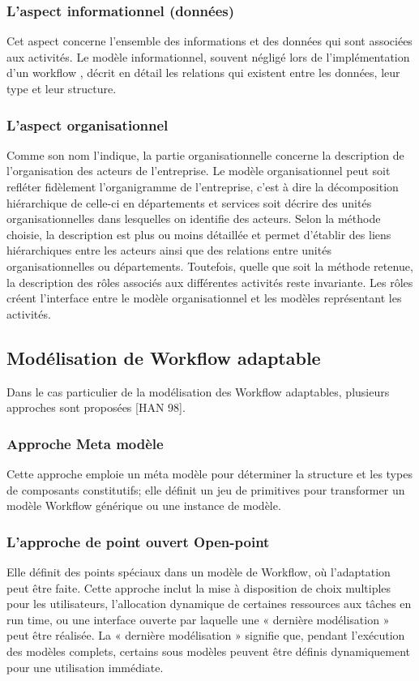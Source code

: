 { 	\subsubsection{ L'aspect informationnel (données) }
 	Cet aspect concerne l'ensemble des informations et des données qui sont associées
 	aux activités. Le modèle informationnel, souvent négligé lors de l'implémentation d'un workflow \parencite{b3}, décrit en détail les relations qui existent entre les données, leur type et leur structure.
 	\subsubsection{L'aspect organisationnel }
 	Comme son nom l'indique, la partie organisationnelle concerne la description de l'organisation des acteurs de l'entreprise. Le modèle organisationnel peut soit refléter fidèlement l'organigramme de l'entreprise, c'est à dire la décomposition hiérarchique de celle-ci en départements et services soit décrire des unités organisationnelles dans lesquelles on identifie des acteurs. Selon la méthode choisie, la description est plus ou moins détaillée et permet d'établir des liens hiérarchiques entre les acteurs ainsi que des relations entre unités organisationnelles ou départements. Toutefois, quelle que soit la méthode retenue, la description des rôles associés aux différentes activités reste invariante. Les rôles créent l'interface entre le modèle organisationnel et les modèles représentant les activités.
 	
 	
 	
 	\subsection{Modélisation de Workflow adaptable }
 	
 	Dans le cas particulier de la modélisation des Workflow adaptables, plusieurs approches sont proposées [HAN 98]. 
 	
 	\subsubsection{ Approche Meta modèle}
 	Cette approche emploie un méta modèle pour déterminer la structure et les types de composants constitutifs; elle définit un jeu de primitives pour transformer un modèle Workflow générique ou une instance de modèle. 
 	
 	\subsubsection{ L’approche de point ouvert Open-point }
 	Elle définit des points spéciaux dans un modèle de Workflow, où l’adaptation peut être faite. Cette approche inclut la mise à disposition de choix multiples pour les utilisateurs, l’allocation dynamique de certaines ressources aux tâches en run time, ou une interface ouverte par laquelle une « dernière modélisation » peut être réalisée. La « dernière modélisation » signifie que, pendant l’exécution des modèles complets, certains sous modèles peuvent être définis dynamiquement pour une utilisation immédiate. 
}
